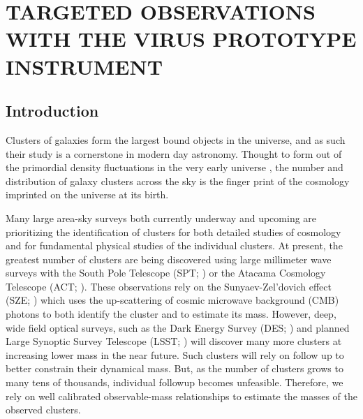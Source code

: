 %
%
%


\renewcommand*{\thefootnote}{\fnsymbol{footnote}}
\chapter[\uppercase{Targeted Observations with the VIRUS Prototype Instrument}]{\uppercase{Targeted Observations with the VIRUS Prototype Instrument} }
\renewcommand*{\thefootnote}{\arabic{footnote}}
\setcounter{footnote}{0}

\section{Introduction} 
Clusters of galaxies form the largest bound objects in the universe, and as such their study is a cornerstone in modern day astronomy. Thought to form out of the primordial density fluctuations in the very early universe , the number and distribution of galaxy clusters across the sky is the finger print of the cosmology imprinted on the universe at its birth.

Many large area-sky surveys both currently underway and upcoming are prioritizing the identification of clusters for both detailed studies of cosmology and for fundamental physical studies of the individual clusters. At present, the greatest number of clusters are being discovered using large millimeter wave surveys with the South Pole Telescope (SPT; \citealt{Carlstrom2011}) or the Atacama Cosmology Telescope (ACT; \citealt{Swetz2011}). These observations rely on the Sunyaev-Zel'dovich effect (SZE; \citealt{Sunyaev1972}) which uses the up-scattering of cosmic microwave background (CMB) photons to both identify the cluster and to estimate its mass. However, deep, wide field optical surveys, such as the Dark Energy Survey (DES; \citealt{DES2005}) and planned Large Synoptic Survey Telescope (LSST; \citealt{LSST2012}) will discover many more clusters at increasing lower mass in the near future. Such clusters will rely on follow up to better constrain their dynamical mass. But, as the number of clusters grows to many tens of thousands, individual followup becomes unfeasible. Therefore, we rely on well calibrated observable-mass relationships to estimate the masses of the observed clusters.

